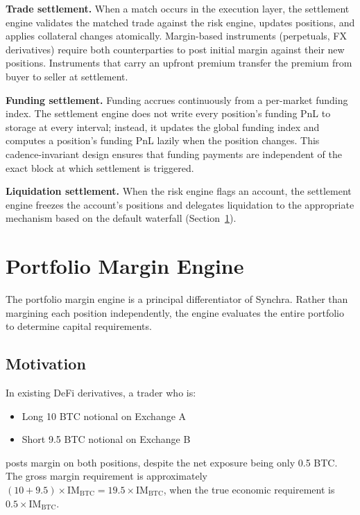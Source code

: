\documentclass[11pt,a4paper]{article}
\begin{document}
\textbf{Trade settlement.} When a match occurs in the execution layer, the settlement engine validates the matched trade against the risk engine, updates positions, and applies collateral changes atomically. Margin-based instruments (perpetuals, FX derivatives) require both counterparties to post initial margin against their new positions. Instruments that carry an upfront premium transfer the premium from buyer to seller at settlement.

\textbf{Funding settlement.} Funding accrues continuously from a per-market funding index. The settlement engine does not write every position's funding PnL to storage at every interval; instead, it updates the global funding index and computes a position's funding PnL lazily when the position changes. This cadence-invariant design ensures that funding payments are independent of the exact block at which settlement is triggered.

\textbf{Liquidation settlement.} When the risk engine flags an account, the settlement engine freezes the account's positions and delegates liquidation to the appropriate mechanism based on the default waterfall (Section~\ref{sec:margin}).

\section{Portfolio Margin Engine}
\label{sec:margin}

The portfolio margin engine is a principal differentiator of Synchra. Rather than margining each position independently, the engine evaluates the entire portfolio to determine capital requirements.

\subsection{Motivation}

In existing DeFi derivatives, a trader who is:
\begin{itemize}
  \item Long 10 BTC notional on Exchange A
  \item Short 9.5 BTC notional on Exchange B
\end{itemize}
posts margin on both positions, despite the net exposure being only 0.5 BTC. The gross margin requirement is approximately $(10 + 9.5) \times \text{IM}_\text{BTC} = 19.5 \times \text{IM}_\text{BTC}$, when the true economic requirement is $0.5 \times \text{IM}_\text{BTC}$.
\end{document}
